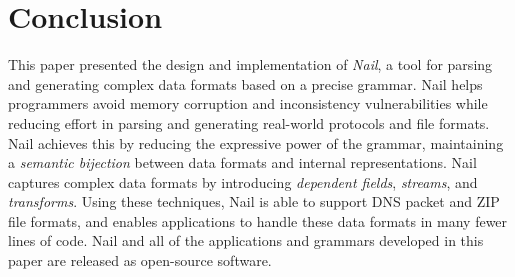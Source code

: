 \section{Conclusion}
\label{s:concl}

This paper presented the design and implementation of \textit{Nail},
a tool for parsing and generating complex data formats based on a
precise grammar.  Nail helps programmers avoid
memory corruption and inconsistency vulnerabilities while reducing effort
in parsing and generating real-world protocols and file formats.
Nail achieves this by reducing the expressive power of the grammar,
maintaining a \emph{semantic bijection} between data formats and internal
representations.  Nail captures complex data formats by introducing
\emph{dependent fields}, \emph{streams}, and \emph{transforms}.
Using these techniques, Nail is able to support DNS packet and ZIP file
formats, and enables applications to handle these data formats in many
fewer lines of code.
Nail and all of the applications and grammars developed in this paper
are released as open-source software.


